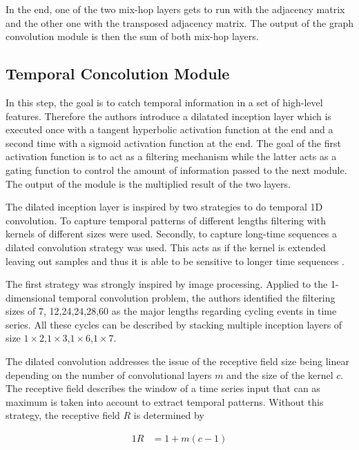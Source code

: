 \documentclass[letterpaper,twocolumn,12pt]{article}
\begin{document}
    In the end, one of the two mix-hop layers gets to run with the adjacency matrix and the other one with the transposed adjacency matrix.
    The output of the graph convolution module is then the sum of both mix-hop layers.

    \subsection{Temporal Concolution Module}
    In this step, the goal is to catch temporal information in a set of high-level features.
    Therefore the authors introduce a dilatated inception layer which is executed once with a tangent hyperbolic activation function at the end
    and a second time with a sigmoid activation function at the end.
    The goal of the first activation function is to act as a filtering mechanism while the latter acts as a gating function
    to control the amount of information passed to the next module.
    The output of the module is the multiplied result of the two layers.

    The dilated inception layer is inspired by two strategies to do temporal 1D convolution.
    To capture temporal patterns of different lengths filtering with kernels of different sizes were used.
    Secondly, to capture long-time sequences a dilated convolution strategy was used.
    This acts as if the kernel is extended leaving out samples and thus it is able to be sensitive to longer time sequences \cite{xi2018deep}.

    The first strategy was strongly inspired by image processing.
    Applied to the 1-dimensional temporal convolution problem, the authors identified the filtering sizes of 7, 12,24,24,28,60
    as the major lengths regarding cycling events in time series.
    All these cycles can be described by stacking multiple inception layers of size $1 \times 2$,$1 \times 3$,$1 \times 6$,$1 \times 7$.

    The dilated convolution addresses the issue of the receptive field size being linear depending on the number of convolutional layers $m$ and the size of the kernel $c$.
    The receptive field describes the window of a time series input that can as maximum is taken into account to extract temporal patterns.
    Without this strategy, the receptive field $R$ is determined by

    \begin{alignat}{1}
        R &= 1 + m(c-1)  \label{eq:receptive_field}
    \end{alignat}
\end{document}
